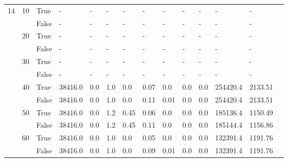 \begin{landscape}
\begin{small}
\begin{longtable}[c]{@{}lll|ll|ll|ll|ll|lll@{}}
  \midrule
14 & 10 & True  & -               & -              & -             & -             & -             & -             & -             & -             & -             & -           &  \\
   &    & False & -               & -              & -             & -             & -             & -             & -             & -             & -             & -           &  \\
   & 20 & True  & -               & -              & -             & -             & -             & -             & -             & -             & -             & -           &  \\
   &    & False & -               & -              & -             & -             & -             & -             & -             & -             & -             & -           &  \\
   & 30 & True  & -               & -              & -             & -             & -             & -             & -             & -             & -             & -           &  \\
   &    & False & -               & -              & -             & -             & -             & -             & -             & -             & -             & -           &  \\
   & 40 & True  & 38416.0         & 0.0            & 1.0           & 0.0           & 0.07          & 0.0           & 0.0           & 0.0           & 254420.4      & 2133.51     &  \\
   &    & False & 38416.0         & 0.0            & 1.0           & 0.0           & 0.11          & 0.01          & 0.0           & 0.0           & 254420.4      & 2133.51     &  \\
   & 50 & True  & 38416.0         & 0.0            & 1.2           & 0.45          & 0.06          & 0.0           & 0.0           & 0.0           & 185136.4      & 1150.49     &  \\
   &    & False & 38416.0         & 0.0            & 1.2           & 0.45          & 0.11          & 0.0           & 0.0           & 0.0           & 185144.4      & 1156.86     &  \\
   & 60 & True  & 38416.0         & 0.0            & 1.0           & 0.0           & 0.05          & 0.0           & 0.0           & 0.0           & 132391.4      & 1191.76     &  \\
   &    & False & 38416.0         & 0.0            & 1.0           & 0.0           & 0.09          & 0.01          & 0.0           & 0.0           & 132391.4      & 1191.76     &  \\

\end{longtable}
\end{small}
\end{landscape}

